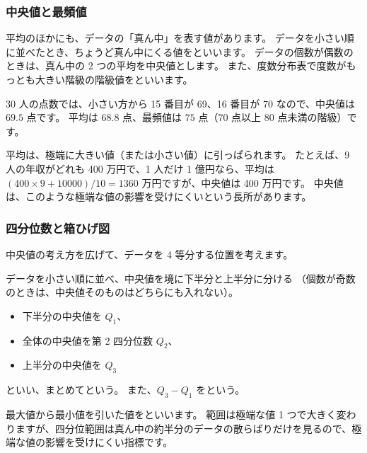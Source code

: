 \subsubsection*{中央値と最頻値}

平均のほかにも、データの「真ん中」を表す値があります。
データを小さい順に並べたとき、ちょうど真ん中にくる値をといいます。
データの個数が偶数のときは、真ん中の 2 つの平均を中央値とします。
また、度数分布表で度数がもっとも大きい階級の階級値をといいます。

30 人の点数では、小さい方から 15 番目が 69、16 番目が 70 なので、中央値は $69.5$ 点です。
平均は $68.8$ 点、最頻値は $75$ 点（70 点以上 80 点未満の階級）です。

平均は、極端に大きい値（または小さい値）に引っぱられます。
たとえば、9 人の年収がどれも 400 万円で、1 人だけ 1 億円なら、平均は $(400 \times 9 + 10000)/10 = 1360$ 万円ですが、中央値は 400 万円です。
中央値は、このような極端な値の影響を受けにくいという長所があります。

\subsubsection*{四分位数と箱ひげ図}

中央値の考え方を広げて、データを 4 等分する位置を考えます。

\begin{definition}
  データを小さい順に並べ、中央値を境に下半分と上半分に分ける
  （個数が奇数のときは、中央値そのものはどちらにも入れない）。
  \begin{itemize}
    \item 下半分の中央値を $Q_1$、
    \item 全体の中央値を第 2 四分位数 $Q_2$、
    \item 上半分の中央値を $Q_3$
  \end{itemize}
  といい、まとめてという。
  また、$Q_3 - Q_1$ をという。
\end{definition}

最大値から最小値を引いた値をといいます。
範囲は極端な値 1 つで大きく変わりますが、四分位範囲は真ん中の約半分のデータの散らばりだけを見るので、極端な値の影響を受けにくい指標です。

